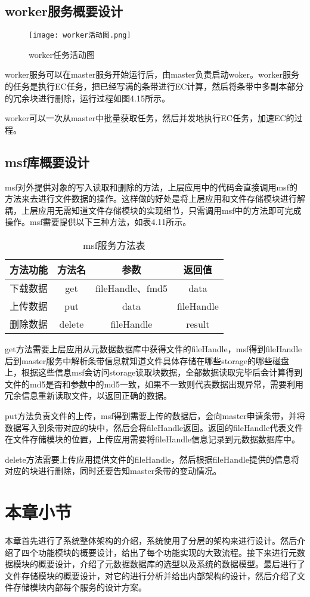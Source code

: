 \subsection{worker服务概要设计}

\begin{figure}[h]
  \centering
  \texttt{[image: worker活动图.png]}
  \caption{worker任务活动图}
\end{figure}

worker服务可以在master服务开始运行后，由master负责启动woker。worker服务的任务是执行EC任务，把已经写满的条带进行EC计算，然后将条带中多副本部分的冗余块进行删除，运行过程如图4.15所示。

worker可以一次从master中批量获取任务，然后并发地执行EC任务，加速EC的过程。

\subsection{msf库概要设计}

msf对外提供对象的写入读取和删除的方法，上层应用中的代码会直接调用msf的方法来去进行文件数据的操作。这样做的好处是将上层应用和文件存储模块进行解耦，上层应用无需知道文件存储模块的实现细节，只需调用msf中的方法即可完成操作。msf需要提供以下三种方法，如表4.11所示。

\begin{table}[h]
  \centering
  \caption{msf服务方法表}
  \begin{tabular}{cccc}
    \toprule
    方法功能   & 方法名    & 参数     & 返回值               \\
    \midrule
    下载数据      & get    & fileHandle、fmd5  & data       \\
    \addlinespace
    上传数据      & put    & data              & fileHandle \\
    \addlinespace
    删除数据      & delete & fileHandle        & result     \\
    \bottomrule
  \end{tabular}
\end{table}	

get方法需要上层应用从元数据数据库中获得文件的fileHandle，msf得到fileHandle后到master服务中解析条带信息就知道文件具体存储在哪些storage的哪些磁盘上，根据这些信息msf会访问storage读取块数据，全部数据读取完毕后会计算得到文件的md5是否和参数中的md5一致，如果不一致则代表数据出现异常，需要利用冗余信息重新读取文件，以返回正确的数据。

put方法负责文件的上传，msf得到需要上传的数据后，会向master申请条带，并将数据写入到条带对应的块中，然后会将fileHandle返回。返回的fileHandle代表文件在文件存储模块的位置，上传应用需要将fileHandle信息记录到元数据数据库中。

delete方法需要上传应用提供文件的fileHandle，然后根据fileHandle提供的信息将对应的块进行删除，同时还要告知master条带的变动情况。

\section{本章小节}
本章首先进行了系统整体架构的介绍，系统使用了分层的架构来进行设计。然后介绍了四个功能模块的概要设计，给出了每个功能实现的大致流程。接下来进行元数据模块的概要设计，介绍了元数据数据库的选型以及系统的数据模型。最后进行了文件存储模块的概要设计，对它的进行分析并给出内部架构的设计，然后介绍了文件存储模块内部每个服务的设计方案。